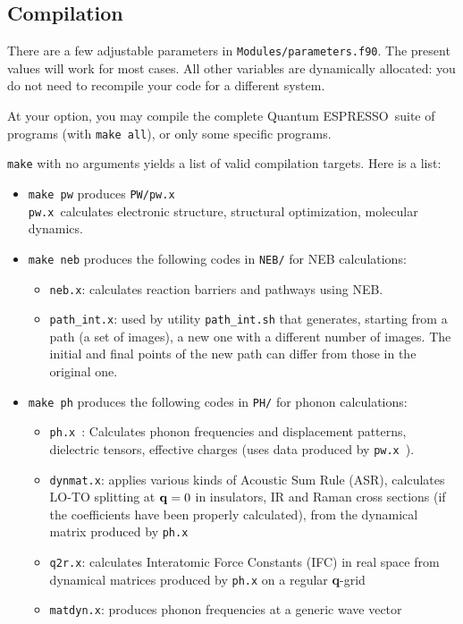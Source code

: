 \documentclass[12pt,a4paper]{article}
\def\qe{{\sc Quantum ESPRESSO}}
\def\pw.x{\texttt{pw.x}}
\def\ph.x{\texttt{ph.x}}
\begin{document}
\subsection{Compilation}

There are a few adjustable parameters in \texttt{Modules/parameters.f90}. 
The
present values will work for most cases. All other variables are dynamically
allocated: you do not need to recompile your code for a different system.
    
At your option, you may compile the complete \qe\ suite of programs 
(with \texttt{make all}), or only some specific programs.

\texttt{make} with no arguments yields a list of valid compilation targets. 
Here is a list:
\begin{itemize}
\item \texttt{make pw} produces \texttt{PW/pw.x} \\
\pw.x\ calculates electronic structure, structural optimization, molecular dynamics.
\item \texttt{make neb} produces the following codes in \texttt{NEB/}
for NEB calculations:
\begin{itemize}
\item \texttt{neb.x}: calculates reaction barriers and pathways using NEB.
\item \texttt{path\_int.x}: used by utility \texttt{path\_int.sh}
  that generates, starting from a path (a set of images), a new one with a 
  different number of images. The initial and final points of the new
 path can differ from those in the original one. 
\end{itemize}
\item \texttt{make ph} produces the following codes in \texttt{PH/}
for phonon calculations:
\begin{itemize}
  \item \ph.x\ : Calculates phonon frequencies and displacement patterns,
    dielectric tensors, effective charges (uses data produced by \pw.x\ ). 
  \item \texttt{dynmat.x}: applies various kinds of Acoustic Sum Rule (ASR),
    calculates LO-TO splitting at ${\bf q} = 0$ in insulators, IR and Raman
    cross sections (if the coefficients have been properly calculated),
    from the dynamical matrix produced by \ph.x\
  \item \texttt{q2r.x}: calculates Interatomic Force Constants (IFC) in real space
    from dynamical matrices produced by \ph.x on a regular {\bf q}-grid 
 \item \texttt{matdyn.x}: produces phonon frequencies at a generic wave vector

\end{itemize}
\end{itemize}
\end{document}
